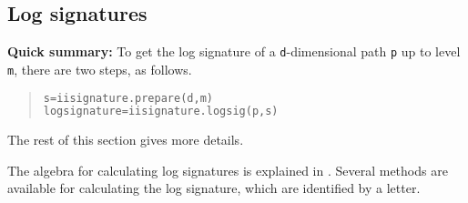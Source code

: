 \documentclass[a4paper]{extarticle}
\begin{document}
\subsection{Log signatures}
\begin{center}
\begin{minipage}{0.7\textwidth}
\noindent\textbf{Quick summary:} To get the log signature of a \verb!d!-dimensional path \verb!p! up to level \verb!m!, there are two steps, as follows.
\begin{quotation}
\begin{lstlisting}[language=Python,keywordstyle=\bf]
s=iisignature.prepare(d,m)
logsignature=iisignature.logsig(p,s)
\end{lstlisting}
\end{quotation}
The rest of this section gives more details.
\end{minipage}
\end{center}
The algebra for calculating log signatures is explained in \cite{LOGSIG}. Several methods are available for calculating the log signature, which are identified by a letter.
\end{document}
